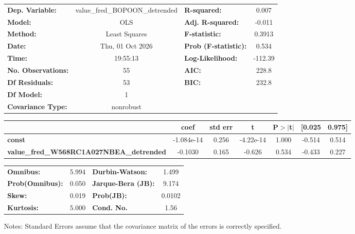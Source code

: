 \begin{center}
\begin{tabular}{lclc}
\toprule
\textbf{Dep. Variable:}                          & value\_fred\_BOPOON\_detrended & \textbf{  R-squared:         } &     0.007   \\
\textbf{Model:}                                  &              OLS               & \textbf{  Adj. R-squared:    } &    -0.011   \\
\textbf{Method:}                                 &         Least Squares          & \textbf{  F-statistic:       } &    0.3913   \\
\textbf{Date:}                                   &        Thu, 01 Oct 2026        & \textbf{  Prob (F-statistic):} &    0.534    \\
\textbf{Time:}                                   &            19:55:13            & \textbf{  Log-Likelihood:    } &   -112.39   \\
\textbf{No. Observations:}                       &                 55             & \textbf{  AIC:               } &     228.8   \\
\textbf{Df Residuals:}                           &                 53             & \textbf{  BIC:               } &     232.8   \\
\textbf{Df Model:}                               &                  1             & \textbf{                     } &             \\
\textbf{Covariance Type:}                        &           nonrobust            & \textbf{                     } &             \\
\bottomrule
\end{tabular}
\begin{tabular}{lcccccc}
                                                 & \textbf{coef} & \textbf{std err} & \textbf{t} & \textbf{P$> |$t$|$} & \textbf{[0.025} & \textbf{0.975]}  \\
\midrule
\textbf{const}                                   &   -1.084e-14  &        0.256     & -4.22e-14  &         1.000        &       -0.514    &        0.514     \\
\textbf{value\_fred\_W568RC1A027NBEA\_detrended} &      -0.1030  &        0.165     &    -0.626  &         0.534        &       -0.433    &        0.227     \\
\bottomrule
\end{tabular}
\begin{tabular}{lclc}
\textbf{Omnibus:}       &  5.994 & \textbf{  Durbin-Watson:     } &    1.499  \\
\textbf{Prob(Omnibus):} &  0.050 & \textbf{  Jarque-Bera (JB):  } &    9.174  \\
\textbf{Skew:}          &  0.019 & \textbf{  Prob(JB):          } &   0.0102  \\
\textbf{Kurtosis:}      &  5.000 & \textbf{  Cond. No.          } &     1.56  \\
\bottomrule
\end{tabular}
\end{center}

Notes: \newline
 [1] Standard Errors assume that the covariance matrix of the errors is correctly specified.